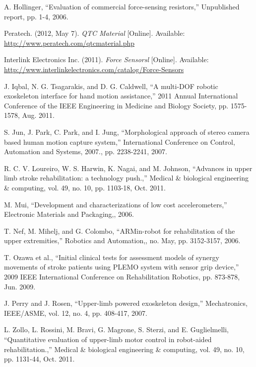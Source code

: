 \documentclass[journal]{IEEEtran}
\begin{document}
\begin{thebibliography}{1}
 A. Hollinger, “Evaluation of commercial force-sensing resistors,” Unpublished report, pp. 1-4, 2006.

 Peratech. (2012, May 7). \emph{QTC Material} [Online]. Available: \url{http://www.peratech.com/qtcmaterial.php}

 Interlink Electronics Inc. (2011). \emph{Force Sensorsl} [Online]. Available: \url{http://www.interlinkelectronics.com/catalog/Force-Sensors}

 J. Iqbal, N. G. Tsagarakis, and D. G. Caldwell, “A multi-DOF robotic exoskeleton interface for hand motion assistance,” 2011 Annual International Conference of the IEEE Engineering in Medicine and Biology Society, pp. 1575-1578, Aug. 2011.

 S. Jun, J. Park, C. Park, and I. Jung, “Morphological approach of stereo camera based human motion capture system,” International Conference on Control, Automation and Systems, 2007., pp. 2238-2241, 2007.

 R. C. V. Loureiro, W. S. Harwin, K. Nagai, and M. Johnson, “Advances in upper limb stroke rehabilitation: a technology push.,” Medical \& biological engineering \& computing, vol. 49, no. 10, pp. 1103-18, Oct. 2011.

 M. Mui, “Development and characterizations of low cost accelerometers,” Electronic Materials and Packaging,, 2006.

 T. Nef, M. Mihelj, and G. Colombo, “ARMin-robot for rehabilitation of the upper extremities,” Robotics and Automation,, no. May, pp. 3152-3157, 2006.

 T. Ozawa et al., “Initial clinical tests for assessment models of synergy movements of stroke patients using PLEMO system with sensor grip device,” 2009 IEEE International Conference on Rehabilitation Robotics, pp. 873-878, Jun. 2009.

 J. Perry and J. Rosen, “Upper-limb powered exoskeleton design,” Mechatronics, IEEE/ASME, vol. 12, no. 4, pp. 408-417, 2007.

 L. Zollo, L. Rossini, M. Bravi, G. Magrone, S. Sterzi, and E. Guglielmelli, “Quantitative evaluation of upper-limb motor control in robot-aided rehabilitation.,” Medical \& biological engineering \& computing, vol. 49, no. 10, pp. 1131-44, Oct. 2011.

\end{thebibliography}
\end{document}

